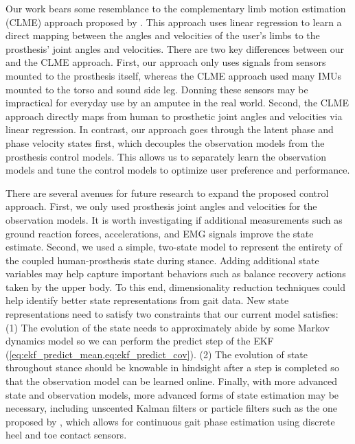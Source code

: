 Our work bears some resemblance to the complementary limb motion estimation
(CLME) approach proposed by \citet{vallery2011complementary}. This approach uses
linear regression to learn a direct mapping between the angles and velocities of
the user's limbs to the prosthesis' joint angles and velocities. There are two
key differences between our and the CLME approach.  First, our approach only
uses signals from sensors mounted to the prosthesis itself, whereas the CLME
approach used many IMUs mounted to the torso and sound side leg. Donning these
sensors may be impractical for everyday use by an amputee in the real world.
Second, the CLME approach directly maps from human to prosthetic joint angles
and velocities via linear regression. In contrast, our approach goes through the
latent phase and phase velocity states first, which decouples the observation
models from the prosthesis control models. This allows us to separately learn
the observation models and tune the control models to optimize user preference
and performance.

There are several avenues for future research to expand the proposed control
approach. First, we only used prosthesis joint angles and velocities for the
observation models. It is worth investigating if additional measurements such as
ground reaction forces, accelerations, and EMG signals improve the state
estimate.  Second, we used a simple, two-state model to represent the entirety
of the coupled human-prosthesis state during stance. Adding additional state
variables may help capture important behaviors such as balance recovery actions
taken by the upper body. To this end, dimensionality reduction techniques could
help identify better state representations from gait data. New state
representations need to satisfy two constraints that our current model
satisfies: (1) The evolution of the state needs to approximately abide by some
Markov dynamics model so we can perform the predict step of the EKF
(\cref{eq:ekf_predict_mean,eq:ekf_predict_cov}). (2) The evolution of state
throughout stance should be knowable in hindsight after a step is completed so
that the observation model can be learned online. Finally, with more advanced
state and observation models, more advanced forms of state estimation may be
necessary, including unscented Kalman filters or particle filters such as the
one proposed by \citet{dhir2018locomotion}, which allows for continuous gait
phase estimation using discrete heel and toe contact sensors. 
